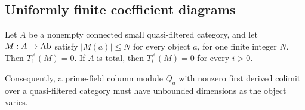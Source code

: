 \subsection{Uniformly finite coefficient diagrams}

\begin{proposition}
\label{A:uniform-finite-coefficients}
Let $A$ be a nonempty connected small quasi-filtered category, and
let $M:A\to\mathrm{Ab}$ satisfy $|M(a)|\leq N$ for every object $a$, for
one finite integer $N$. Then $T_1^A(M)=0$. If $A$ is total, then
$T_i^A(M)=0$ for every $i>0$.

Consequently, a prime-field column module $Q_a$ with nonzero first
derived colimit over a quasi-filtered category must have unbounded
dimensions as the object varies.
\end{proposition}
